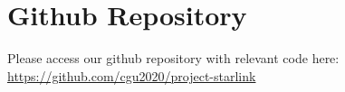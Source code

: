 \documentclass[acmsmall]{acmart}
\begin{document}



\appendix


\section{Github Repository}
Please access our github repository with relevant code here: \url{https://github.com/cgu2020/project-starlink}
\end{document}
